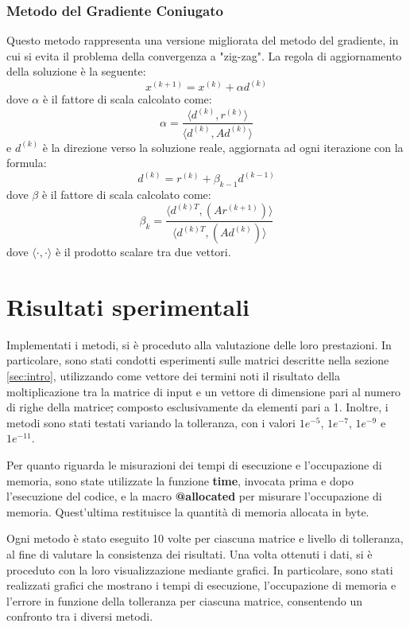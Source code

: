 \subsubsection{Metodo del Gradiente Coniugato}
Questo metodo rappresenta una versione migliorata del metodo del gradiente, in
cui si evita il problema della convergenza a "zig-zag". La regola di aggiornamento
della soluzione è la seguente:
\begin{equation}
    x^{(k+1)} = x^{(k)} + \alpha d^{(k)}
\end{equation}
dove $\alpha$ è il fattore di scala calcolato come:
\begin{equation}
    \alpha = \frac{\langle d^{(k)}, r^{(k)}\rangle}{\langle d^{(k)}, Ad^{(k)}\rangle}
\end{equation}
e $d^{(k)}$ è la direzione verso la soluzione reale, aggiornata ad ogni iterazione
con la formula:
\begin{equation}
    d^{(k)} = r^{(k)} + \beta_{k-1} d^{(k-1)}
\end{equation}
dove $\beta$ è il fattore di scala calcolato come:
\begin{equation}
    \beta_k = \frac{\langle d^{(k)T}, (Ar^{(k + 1)})\rangle}{\langle d^{(k)T}, (Ad^{(k)})\rangle}
\end{equation}
dove $\langle \cdot, \cdot \rangle$ è il prodotto scalare tra due vettori.

\section{Risultati sperimentali}
Implementati i metodi, si è proceduto alla valutazione delle loro prestazioni.
In particolare, sono stati condotti esperimenti sulle matrici descritte nella
sezione \ref{sec:intro}, utilizzando come vettore dei termini noti il risultato
della moltiplicazione tra la matrice di input e un vettore di dimensione pari al
numero di righe della matrice\st{,} composto esclusivamente da elementi pari a 1.
Inoltre, i metodi sono stati testati variando la tolleranza, con i valori $1e^{-5}$,
$1e^{-7}$, $1e^{-9}$ e $1e^{-11}$.

Per quanto riguarda le misurazioni dei tempi di esecuzione e l'occupazione di
memoria, sono state utilizzate la funzione \textbf{time}, invocata prima e dopo
l'esecuzione del codice, e la macro \textbf{@allocated} per misurare l'occupazione
di memoria. Quest'ultima restituisce la quantità di memoria allocata in byte.

Ogni metodo è stato eseguito 10 volte per ciascuna matrice e livello di tolleranza,
al fine di valutare la consistenza dei risultati. Una volta ottenuti i dati, si è
proceduto con la loro visualizzazione mediante grafici. In particolare, sono stati
realizzati grafici che mostrano i tempi di esecuzione, l'occupazione di memoria
e l'errore in funzione della tolleranza per ciascuna matrice, consentendo un confronto tra
i diversi metodi. 


